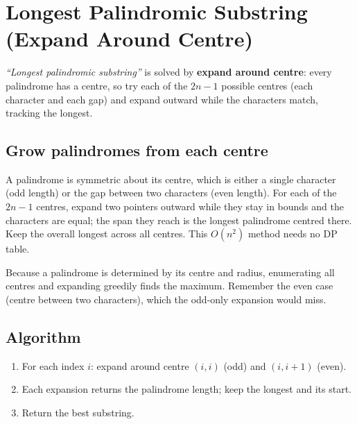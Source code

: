 \section{Longest Palindromic Substring (Expand Around Centre)}
\label{sec:str-longest-palindromic-substring}


\begin{patternbox}
\emph{``Longest palindromic substring''} is solved by \textbf{expand around
centre}: every palindrome has a centre, so try each of the $2n-1$ possible
centres (each character and each gap) and expand outward while the
characters match, tracking the longest.
\end{patternbox}

\subsection*{Grow palindromes from each centre}

A palindrome is symmetric about its centre, which is either a single
character (odd length) or the gap between two characters (even length). For
each of the $2n-1$ centres, expand two pointers outward while they stay in
bounds and the characters are equal; the span they reach is the longest
palindrome centred there. Keep the overall longest across all centres. This
$O(n^2)$ method needs no DP table.

\begin{ideabox}
Because a palindrome is determined by its centre and radius, enumerating all
centres and expanding greedily finds the maximum. Remember the even case
(centre between two characters), which the odd-only expansion would miss.
\end{ideabox}

\subsection*{Algorithm}

\begin{enumerate}
  \item For each index $i$: expand around centre $(i,i)$ (odd) and
        $(i,i+1)$ (even).
  \item Each expansion returns the palindrome length; keep the longest and
        its start.
  \item Return the best substring.
\end{enumerate}

